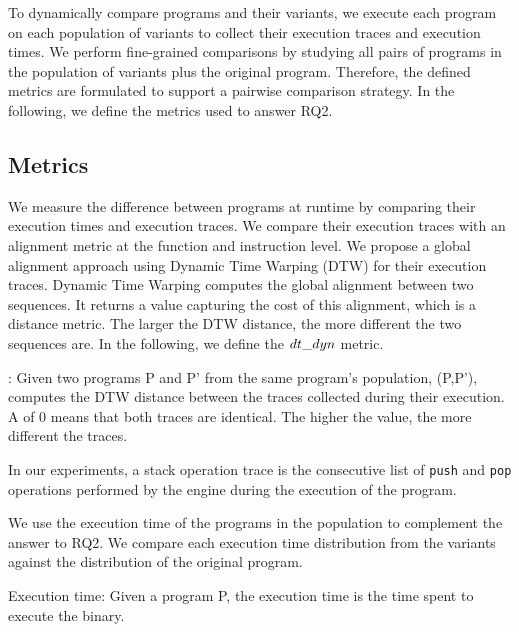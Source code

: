To dynamically compare programs and their variants, we execute each program on each population of variants to collect their execution traces and execution times. We perform fine-grained comparisons by studying all pairs of programs in the population of variants plus the original program. Therefore, the defined metrics are formulated to support a pairwise comparison strategy.
In the following, we define the metrics used to answer RQ2.

\subsection*{Metrics}

We measure the difference between programs at runtime by comparing their execution times and execution traces. We compare their execution traces with an alignment metric at the function and instruction level. We propose a global alignment approach using Dynamic Time Warping (DTW) for their execution traces. %
Dynamic Time Warping \cite{Maia08usinga} computes the global alignment between two sequences. It returns a value capturing the cost of this alignment, which is a distance metric. The larger the DTW distance, the more different the two sequences are.
In the following, we define the $dt\_dyn$ metric. 
 

\begin{metric}{\DTW{}:}
\label{metric:stack}
	Given two programs P and P' from the same program's population, \DTW{}(P,P'), computes the DTW distance between the traces collected during their execution. \\
	A \DTW{} of $0$ means that both traces are identical.
	The higher the value, the more different the traces. 
\end{metric}



In our experiments, a stack operation trace is the consecutive list of \texttt{push} and \texttt{pop} operations performed by the \wasm engine during the execution of the program.

We use the execution time of the programs in the population to complement the answer to RQ2. We compare each execution time distribution from the variants against the distribution of the original program.

\begin{metric}{Execution time:}\label{metric:time}
	Given a \wasm program P, the execution time is the time spent to execute the binary.
\end{metric}

